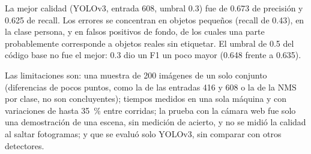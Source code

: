 \documentclass[11pt,letterpaper]{article}
\begin{document}
La mejor calidad (YOLOv3, entrada 608, umbral 0.3) fue de 0.673 de precisión y 0.625 de recall. Los errores se concentran en objetos pequeños (recall de 0.43), en la clase persona, y en falsos positivos de fondo, de los cuales una parte probablemente corresponde a objetos reales sin etiquetar. El umbral de 0.5 del código base no fue el mejor: 0.3 dio un F1 un poco mayor (0.648 frente a 0.635).

Las limitaciones son: una muestra de 200 imágenes de un solo conjunto (diferencias de pocos puntos, como la de las entradas 416 y 608 o la de la NMS por clase, no son concluyentes); tiempos medidos en una sola máquina y con variaciones de hasta 35~\% entre corridas; la prueba con la cámara web fue solo una demostración de una escena, sin medición de acierto, y no se midió la calidad al saltar fotogramas; y que se evaluó solo YOLOv3, sin comparar con otros detectores.

\end{document}
